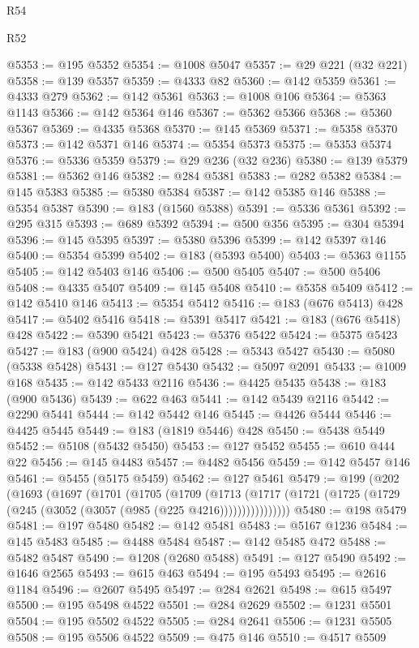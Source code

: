 \begin{lexlean}{R54}
\begin{lexlean}{R52}
\begin{coremodule}
{{{{{{{{{{{{{{{{{{{{{{{{{{{{{{{{{{{{{{{{{{{{{{{{{{{{{{{{{{{{{{{{{{{{{{{{{{{{{{{{{{{{{{{{{{{{{{{{{{{{{{{{{{{{{{{{{{{{{{{{{{{{{{{{{{{{{{{{{{{{{{{{{{{{{{{{{{{{{{{{{{{{{{{{{{{{{{{{{{{{{{{{{{{{{{{{{{{{{{@5353 := @195 @5352
@5354 := @1008 @5047
@5357 := @29 @221 (@32 @221)
@5358 := @139 @5357
@5359 := @4333 @82
@5360 := @142 @5359
@5361 := @4333 @279
@5362 := @142 @5361
@5363 := @1008 @106
@5364 := @5363 @1143
@5366 := @142 @5364 @146
@5367 := @5362 @5366
@5368 := @5360 @5367
@5369 := @4335 @5368
@5370 := @145 @5369
@5371 := @5358 @5370
@5373 := @142 @5371 @146
@5374 := @5354 @5373
@5375 := @5353 @5374
@5376 := @5336 @5359
@5379 := @29 @236 (@32 @236)
@5380 := @139 @5379
@5381 := @5362 @146
@5382 := @284 @5381
@5383 := @282 @5382
@5384 := @145 @5383
@5385 := @5380 @5384
@5387 := @142 @5385 @146
@5388 := @5354 @5387
@5390 := @183 (@1560 @5388)
@5391 := @5336 @5361
@5392 := @295 @315
@5393 := @689 @5392
@5394 := @500 @356
@5395 := @304 @5394
@5396 := @145 @5395
@5397 := @5380 @5396
@5399 := @142 @5397 @146
@5400 := @5354 @5399
@5402 := @183 (@5393 @5400)
@5403 := @5363 @1155
@5405 := @142 @5403 @146
@5406 := @500 @5405
@5407 := @500 @5406
@5408 := @4335 @5407
@5409 := @145 @5408
@5410 := @5358 @5409
@5412 := @142 @5410 @146
@5413 := @5354 @5412
@5416 := @183 (@676 @5413) @428
@5417 := @5402 @5416
@5418 := @5391 @5417
@5421 := @183 (@676 @5418) @428
@5422 := @5390 @5421
@5423 := @5376 @5422
@5424 := @5375 @5423
@5427 := @183 (@900 @5424) @428
@5428 := @5343 @5427
@5430 := @5080 (@5338 @5428)
@5431 := @127 @5430
@5432 := @5097 @2091
@5433 := @1009 @168
@5435 := @142 @5433 @2116
@5436 := @4425 @5435
@5438 := @183 (@900 @5436)
@5439 := @622 @463
@5441 := @142 @5439 @2116
@5442 := @2290 @5441
@5444 := @142 @5442 @146
@5445 := @4426 @5444
@5446 := @4425 @5445
@5449 := @183 (@1819 @5446) @428
@5450 := @5438 @5449
@5452 := @5108 (@5432 @5450)
@5453 := @127 @5452
@5455 := @610 @444 @22
@5456 := @145 @4483
@5457 := @4482 @5456
@5459 := @142 @5457 @146
@5461 := @5455 (@5175 @5459)
@5462 := @127 @5461
@5479 := @199
    (@202
      (@1693
        (@1697
          (@1701
            (@1705
              (@1709
                (@1713
                  (@1717 (@1721 (@1725 (@1729 (@245 (@3052 (@3057 (@985 (@225 @4216))))))))))))))))
@5480 := @198 @5479
@5481 := @197 @5480
@5482 := @142 @5481
@5483 := @5167 @1236
@5484 := @145 @5483
@5485 := @4488 @5484
@5487 := @142 @5485 @472
@5488 := @5482 @5487
@5490 := @1208 (@2680 @5488)
@5491 := @127 @5490
@5492 := @1646 @2565
@5493 := @615 @463
@5494 := @195 @5493
@5495 := @2616 @1184
@5496 := @2607 @5495
@5497 := @284 @2621
@5498 := @615 @5497
@5500 := @195 @5498 @4522
@5501 := @284 @2629
@5502 := @1231 @5501
@5504 := @195 @5502 @4522
@5505 := @284 @2641
@5506 := @1231 @5505
@5508 := @195 @5506 @4522
@5509 := @475 @146
@5510 := @4517 @5509
}}}}}}}}}}}}}}}}}}}}}}}}}}}}}}}}}}}}}}}}}}}}}}}}}}}}}}}}}}}}}}}}}}}}}}}}}}}}}}}}}}}}}}}}}}}}}}}}}}}}}}}}}}}}}}}}}}}}}}}}}}}}}}}}}}}}}}}}}}}}}}}}}}}}}}}}}}}}}}}}}}}}}}}}}}}}}}}}}}}}}}}}}}}}}}}}}}}}}}
\end{coremodule}
\end{lexlean}
\end{lexlean}
